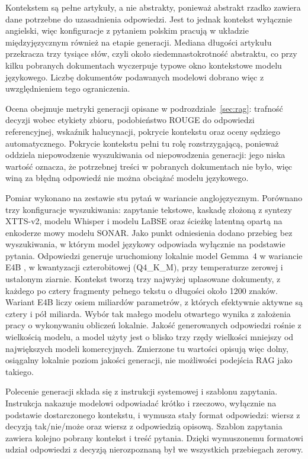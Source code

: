 Kontekstem są pełne artykuły, a nie abstrakty, ponieważ abstrakt rzadko zawiera dane
potrzebne do uzasadnienia odpowiedzi. Jest to jednak kontekst wyłącznie angielski, więc konfiguracje
z pytaniem polskim pracują w układzie międzyjęzycznym również na etapie generacji. Mediana długości
artykułu przekracza trzy tysiące słów, czyli około siedemnastokrotność abstraktu, co przy kilku
pobranych dokumentach wyczerpuje typowe okno kontekstowe modelu językowego. Liczbę dokumentów
podawanych modelowi dobrano więc z uwzględnieniem tego ograniczenia.

Ocena obejmuje metryki generacji opisane w podrozdziale~\ref{sec:rag}: trafność decyzji wobec etykiety zbioru,
podobieństwo ROUGE do odpowiedzi referencyjnej, wskaźnik halucynacji, pokrycie kontekstu oraz oceny
sędziego automatycznego. Pokrycie kontekstu pełni tu rolę rozstrzygającą, ponieważ oddziela
niepowodzenie wyszukiwania od niepowodzenia generacji: jego niska wartość oznacza, że potrzebnej
treści w pobranych dokumentach nie było, więc winą za błędną odpowiedź nie można obciążać modelu
językowego.

Pomiar wykonano na zestawie stu pytań w wariancie anglojęzycznym. Porównano trzy konfiguracje
wyszukiwania: zapytanie tekstowe, kaskadę złożoną z syntezy XTTS-v2, modelu Whisper i modelu
LaBSE oraz ścieżkę latentną opartą na enkoderze mowy modelu SONAR. Jako punkt odniesienia dodano
przebieg bez wyszukiwania, w którym model językowy odpowiada wyłącznie na podstawie pytania.
Odpowiedzi generuje uruchomiony lokalnie model Gemma~4 w wariancie E4B \cite{gemma4},
w kwantyzacji czterobitowej (Q4\_K\_M), przy temperaturze zerowej i ustalonym ziarnie. Kontekst
tworzą trzy najwyżej uplasowane dokumenty, z każdego po cztery fragmenty pełnego tekstu
o długości około 1200 znaków. Wariant E4B liczy osiem miliardów parametrów, z których efektywnie
aktywne są cztery i pół miliarda. Wybór tak małego modelu otwartego wynika z założenia pracy
o wykonywaniu obliczeń lokalnie. Jakość generowanych odpowiedzi rośnie z wielkością modelu,
a model użyty jest o blisko trzy rzędy wielkości mniejszy od największych modeli komercyjnych.
Zmierzone tu wartości opisują więc dolny, osiągalny lokalnie poziom jakości generacji, nie
możliwości podejścia RAG jako takiego.

Polecenie generacji składa się z instrukcji systemowej i szablonu zapytania. Instrukcja
nakazuje modelowi odpowiadać krótko i rzeczowo, wyłącznie na podstawie dostarczonego kontekstu,
i wymusza stały format odpowiedzi: wiersz z decyzją tak/nie/może oraz wiersz z odpowiedzią
opisową. Szablon zapytania zawiera kolejno pobrany kontekst i treść pytania. Dzięki wymuszonemu
formatowi udział odpowiedzi z decyzją nierozpoznaną był we wszystkich przebiegach zerowy.

